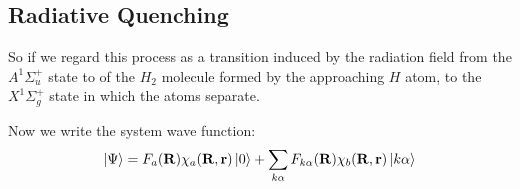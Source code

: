 \subsection{Radiative  Quenching }

So if we regard this process as a transition induced by the radiation field from the $ A^{1}\Sigma^{+}_u $ state to of the $ H_2 $ molecule formed by the approaching $ H $ atom, to the $ X^{1}\Sigma^{+}_g $ state in which the atoms separate.

Now we write the system wave function:
\begin{equation}\label{ansatzWave1}
\Ket{\Psi} = F_a(\mathbf{R})\chi_a(\mathbf{R},\mathbf{r})\Ket{0} + \sum_{k\alpha}{F_{k\alpha}(\mathbf{R})\chi_b(\mathbf{R},\mathbf{r})\Ket{k\alpha}}
\end{equation}

